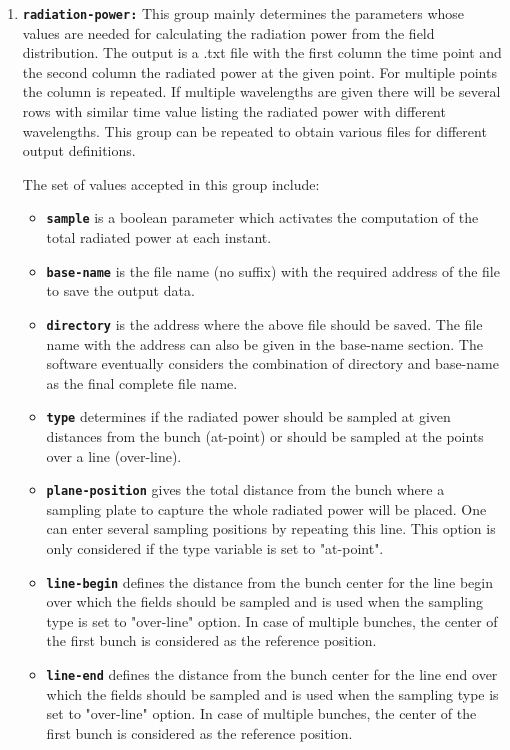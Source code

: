 \begin{enumerate}
\item \textbf{\texttt{radiation-power:}} This group mainly determines the parameters whose values are needed for calculating the radiation power from the field distribution. The output is a .txt file with the first column the time point and the second column the radiated power at the given point. For multiple points the column is repeated. If multiple wavelengths are given there will be several rows with similar time value listing the radiated power with different wavelengths. This group can be repeated to obtain various files for different output definitions. %

The set of values accepted in this group include:
\begin{itemize}
	\item \textbf{\texttt{sample}} is a boolean parameter which activates the computation of the total radiated power at each instant.
	\item \textbf{\texttt{base-name}} is the file name (no suffix) with the required address of the file to save the output data.
	\item \textbf{\texttt{directory}} is the address where the above file should be saved. The file name with the address can also be given in the base-name section. The software eventually considers the combination of directory and base-name as the final complete file name.
	\item \textbf{\texttt{type}} determines if the radiated power should be sampled at given distances from the bunch (at-point) or should be sampled at the points over a line (over-line).
	\item \textbf{\texttt{plane-position}} gives the total distance from the bunch where a sampling plate to capture the whole radiated power will be placed.  One can enter several sampling positions by repeating this line. This option is only considered if the type variable is set to "at-point".
	\item \textbf{\texttt{line-begin}} defines the distance from the bunch center for the line begin over which the fields should be sampled and is used when the sampling type is set to "over-line" option. In case of multiple bunches, the center of the first bunch is considered as the reference position.
	\item \textbf{\texttt{line-end}} defines the distance from the bunch center for the line end over which the fields should be sampled and is used when the sampling type is set to "over-line" option. In case of multiple bunches, the center of the first bunch is considered as the reference position.

\end{itemize}
\end{enumerate}
